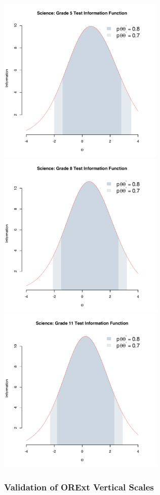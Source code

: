 \documentclass[]{article}
\begin{document}
\FloatBarrier
\includegraphics[height=3.12500in]{tifs/science5tif.pdf}
\includegraphics[height=3.12500in]{tifs/science8tif.pdf}
\includegraphics[height=3.12500in]{tifs/science11tif.pdf}

\subsubsection{Validation of ORExt Vertical
Scales}\label{validation-of-orext-vertical-scales}
\end{document}
